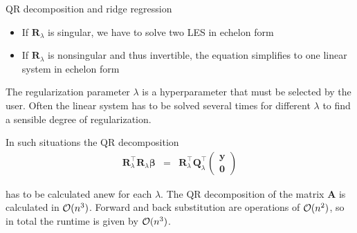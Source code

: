 \documentclass[11pt,compress,t,notes=noshow, xcolor=table]{beamer}
\begin{document}
\begin{vbframe}{QR decomposition and ridge regression}
\begin{itemize}
\item If $\bm{R}_\lambda$ is singular, we have to solve two LES in echelon form
\item If $\bm{R}_\lambda$ is nonsingular and thus invertible, the equation simplifies to one linear system in echelon form
\end{itemize}

\lz
The regularization parameter $\lambda$ is a hyperparameter that must be selected by the user. Often the linear system has to be solved several times for different $\lambda$ to find a sensible degree of regularization.
  
\medskip

In such situations the QR decomposition
\vspace*{-0.2cm}
\begin{eqnarray*}
\mathbf{R}_\lambda^\top\mathbf{R}_\lambda\boldsymbol{\beta} &=& \mathbf{R}_\lambda^\top\mathbf{Q}_\lambda^\top \begin{pmatrix} \mathbf{y} \\ \mathbf{0} \end{pmatrix} 
\end{eqnarray*}

has to be calculated anew for each $\lambda$. The QR decomposition of the matrix $\bm{A}$ is calculated in $\mathcal{O}(n^3)$. Forward and back substitution are operations of $\mathcal{O}(n^2)$, so in total the runtime is given by $\mathcal{O}(n^3)$.



\end{vbframe}
\end{document}
